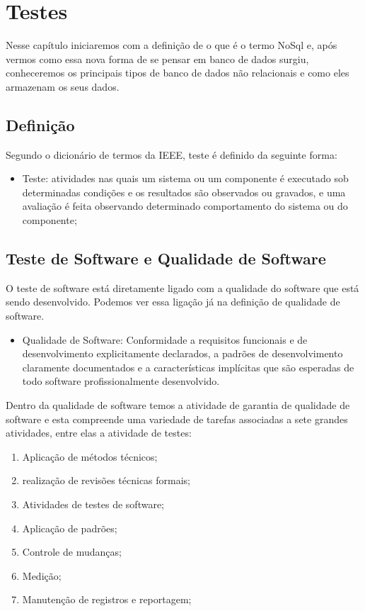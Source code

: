 \chapter{Testes}


Nesse capítulo iniciaremos com a definição de o que é o termo NoSql e, após vermos como essa nova forma de se pensar em banco de dados surgiu, conheceremos os principais tipos de banco de dados não relacionais e como eles armazenam os seus dados. 


\section{Definição}

Segundo o dicionário de termos da IEEE, teste é definido da seguinte forma:

\begin{itemize}
	\item Teste: atividades nas quais um sistema ou um componente é executado sob determinadas condições e os resultados são observados ou gravados, e uma avaliação é feita observando determinado comportamento do sistema ou do componente;
\end{itemize}

\section{Teste de Software e Qualidade de Software}

O teste de software está diretamente ligado com a qualidade do software que está sendo desenvolvido. Podemos ver essa ligação já na definição de qualidade de software.

\begin{itemize}
	\item Qualidade de Software: Conformidade a requisitos funcionais e de desenvolvimento explicitamente declarados, a padrões de desenvolvimento claramente documentados e a características implícitas que são esperadas de todo software profissionalmente desenvolvido.
\end {itemize}

Dentro da qualidade de software temos a atividade de garantia de qualidade de software e esta compreende uma variedade de tarefas associadas a sete grandes atividades, entre elas a atividade de testes:

\begin{enumerate}
	\item Aplicação de métodos técnicos;
	\item realização de revisões técnicas formais;
	\item Atividades de testes de software;
	\item Aplicação de padrões;
	\item Controle de mudanças;
	\item Medição;
	\item Manutenção de registros e reportagem;
\end{enumerate}

